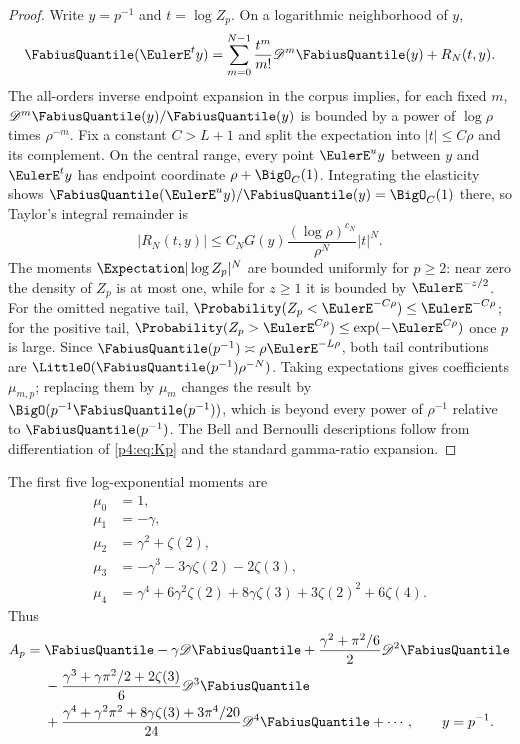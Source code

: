 \documentclass[11pt,oneside]{article}
\theoremstyle{definition}
\theoremstyle{remark}
\begin{document}
\begin{proof}
Write $y=p^{-1}$ and $t=\log Z_p$.  On a logarithmic neighborhood of $y$,
\[
 \FabiusQuantile(\EulerE^t y)
 =\sum_{m=0}^{N-1}\frac{t^m}{m!}\Dop^m\FabiusQuantile(y)+R_N(t,y).
\]
The all-orders inverse endpoint expansion in the corpus implies, for each fixed $m$,
$\Dop^m\FabiusQuantile(y)/\FabiusQuantile(y)$ is bounded by a power of
$\log\rho$ times $\rho^{-m}$.
Fix a constant $C>L+1$ and split the expectation into $|t|\leq C\rho$ and its complement.
On the central range, every point $\EulerE^u y$ between $y$ and $\EulerE^t y$ has endpoint coordinate
$\rho+\BigO_C(1)$.  Integrating the elasticity shows
$\FabiusQuantile(\EulerE^u y)/\FabiusQuantile(y)=\BigO_C(1)$ there, so
Taylor's integral remainder is
\[
 |R_N(t,y)|\leq C_NG(y)\frac{(\log\rho)^{c_N}}{\rho^N}|t|^N.
\]
The moments $\Expectation|\log Z_p|^N$ are bounded uniformly for $p\geq2$: near zero the density of
$Z_p$ is at most one, while for $z\geq1$ it is bounded by $\EulerE^{-z/2}$.
For the omitted negative tail,
$\Probability(Z_p<\EulerE^{-C\rho})\leq\EulerE^{-C\rho}$; for the positive tail,
$\Probability(Z_p>\EulerE^{C\rho})\leq\exp(-\EulerE^{C\rho})$ once $p$ is large.  Since
$\FabiusQuantile(p^{-1})\asymp\rho\EulerE^{-L\rho}$, both tail contributions
are $\LittleO(\FabiusQuantile(p^{-1})\rho^{-N})$.  Taking expectations gives
coefficients $\mu_{m,p}$; replacing them by $\mu_m$ changes the result by
$\BigO(p^{-1}\FabiusQuantile(p^{-1}))$, which is beyond every power of
$\rho^{-1}$ relative to $\FabiusQuantile(p^{-1})$.  The Bell and Bernoulli descriptions
follow from differentiation of \eqref{p4:eq:Kp} and the standard gamma-ratio expansion.
\end{proof}

The first five log-exponential moments are
\begin{align}
 \mu_0&=1,\nonumber\\
 \mu_1&=-\gamma,\nonumber\\
 \mu_2&=\gamma^2+\zeta(2),\nonumber\\
 \mu_3&=-\gamma^3-3\gamma\zeta(2)-2\zeta(3),\nonumber\\
 \mu_4&=\gamma^4+6\gamma^2\zeta(2)+8\gamma\zeta(3)
       +3\zeta(2)^2+6\zeta(4).
 \label{p4:eq:first-mu}
\end{align}
Thus
\begin{align}
 A_p={}&\FabiusQuantile-\gamma\Dop\FabiusQuantile
 +\frac{\gamma^2+\pi^2/6}{2}\Dop^2\FabiusQuantile\nonumber\\
 &-\frac{\gamma^3+\gamma\pi^2/2+2\zeta(3)}{6}\Dop^3\FabiusQuantile\nonumber\\
 &+\frac{\gamma^4+\gamma^2\pi^2+8\gamma\zeta(3)+3\pi^4/20}{24}
 \Dop^4\FabiusQuantile
 +\cdots,
 \qquad y=p^{-1}.
 \label{p4:eq:Gamma-operator-first-terms}
\end{align}
\end{document}
